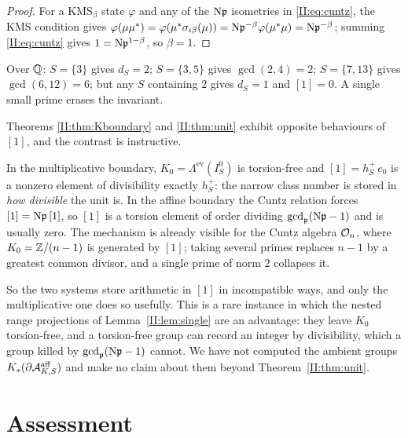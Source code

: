 \begin{proof}
For a $\mathrm{KMS}_\beta$ state $\varphi$ and any of the $\mathrm{N}\mathfrak{p}$ isometries in
\eqref{II:eq:cuntz}, the KMS condition gives
$\varphi(\mu\mu^*)=\varphi(\mu^*\sigma_{i\beta}(\mu))=\mathrm{N}\mathfrak{p}^{-\beta}\varphi(\mu^*\mu)=\mathrm{N}\mathfrak{p}^{-\beta}$;
summing \eqref{II:eq:cuntz} gives $1=\mathrm{N}\mathfrak{p}^{1-\beta}$, so $\beta=1$.
\end{proof}

\begin{example}
Over $\mathbb{Q}$: $S=\{3\}$ gives $d_S=2$; $S=\{3,5\}$ gives $\gcd(2,4)=2$; $S=\{7,13\}$ gives
$\gcd(6,12)=6$; but any $S$ containing $2$ gives $d_S=1$ and $[1]=0$. A single small prime
erases the invariant.
\end{example}

\begin{remark}\label{II:rem:twounits}
Theorems \ref{II:thm:Kboundary} and \ref{II:thm:unit} exhibit opposite behaviours of $[1]$, and
the contrast is instructive.

In the multiplicative boundary, $K_0=\Lambda^{\mathrm{ev}}(I_S^0)$ is torsion-free and
$[1]=h^+_S\,e_0$ is a nonzero element of divisibility exactly $h^+_S$: the narrow class
number is stored in \emph{how divisible} the unit is. In the affine boundary the Cuntz
relation forces $[1]=\mathrm{N}\mathfrak{p}\,[1]$, so $[1]$ is a torsion element of order dividing
$\gcd_{\mathfrak{p}}(\mathrm{N}\mathfrak{p}-1)$ and is usually zero. The mechanism is already visible for the Cuntz
algebra $\mathcal{O}_n$, where $K_0=\mathbb{Z}/(n-1)$ is generated by $[1]$; taking several primes replaces
$n-1$ by a greatest common divisor, and a single prime of norm $2$ collapses it.

So the two systems store arithmetic in $[1]$ in incompatible ways, and only the
multiplicative one does so usefully. This is a rare instance in which the nested range
projections of Lemma~\ref{II:lem:single} are an advantage: they leave $K_0$ torsion-free, and a
torsion-free group can record an integer by divisibility, which a group killed by
$\gcd_{\mathfrak{p}}(\mathrm{N}\mathfrak{p}-1)$ cannot. We have not computed the ambient groups
$K_*(\partial\mathcal{A}^{\mathrm{aff}}_{K,S})$ and make no claim about them beyond
Theorem~\ref{II:thm:unit}.
\end{remark}

\section{Assessment}

